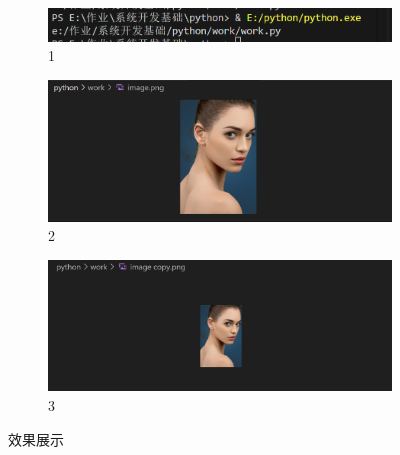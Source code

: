 \documentclass[UTF8]{ctexart}
\begin{document}
\begin{enumerate}
\begin{itemize}
\begin{figure}[H]
    \centering
    \begin{subfigure}[b]{0.32\textwidth} %
        \includegraphics[width=\textwidth]{31} %
        \caption{1}
        \label{fig:left}
    \end{subfigure}
    \hfill
    \begin{subfigure}[b]{0.32\textwidth} %
        \includegraphics[width=\textwidth]{32} %
        \caption{2}
        \label{fig:middle}
    \end{subfigure}
    \hfill
    \begin{subfigure}[b]{0.32\textwidth} %
        \includegraphics[width=\textwidth]{33} %
        \caption{3}
        \label{fig:right}
    \end{subfigure}
    \caption{效果展示}
    \label{fig:three_images}
\end{figure}

  \end{itemize}
\end{enumerate}
\end{document}
